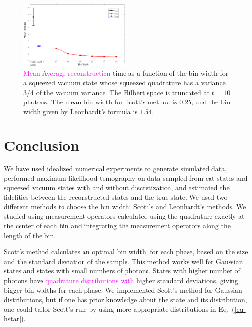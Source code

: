 \documentclass[
reprint,
superscriptaddress,
showpacs,
amsmath,
amssymb,
aps,
pra,
longbibliography
]{revtex4-1}
\providecommand{\aucmnt}[1]{#1}
\providecommand{\editcolor}[2]{\textcolor{#1}{#2}}
\providecommand{\aucmnt}[1]{}
\providecommand{\editcolor}[2]{#2}
\newcommand{\SG}[1]{\editcolor{magenta}{#1}}
\newcommand{\SGs}[1]{\aucmnt{\editcolor{magenta}{\sout{#1}}}}
\begin{document}
\begin{figure}
  \includegraphics[width=0.49\textwidth]{time-vacuocomprimido.eps}
  \caption{\SGs{Mean} \SG{Average reconstruction} time as a function
    of the bin width for a squeezed vacuum state whose squeezed
    quadrature has a variance 3/4 of the vacuum variance. The Hilbert
    space is truncated at $t=10$ photons. The mean bin width for
    Scott's method is $0.25$, and the bin width given by Leonhardt's
    formula is $1.54$.}
  \label{fig-time-squeezed}
\end{figure}



\section{Conclusion}
\label{conclusion}

We have used idealized numerical experiments to generate simulated
data, performed maximum likelihood tomography on data sampled
from cat states and squeezed vacuum states with and without
discretization, and estimated the fidelities between
the reconstructed states and the true state. We used two different
methods to choose the bin width: Scott's and Leonhardt's methods. We
studied using measurement operators calculated using the
quadrature exactly at the center of each bin and integrating the
measurement operators along the length of the bin. 

Scott's method calculates an optimal bin width, for each phase, based
on the size and the standard deviation of the sample. This method
works well for Gaussian states and states with small numbers of
photons.  States with higher number of photons have \SG{quadrature
  distributions with} higher standard deviations, giving bigger bin
widths for each phase. We implemented Scott's method for Gaussian
distributions, but if one has prior knowledge about the state and its
distribution, one could tailor Scott's rule by using more appropriate
distributions in Eq.~(\ref{eq-hstar}).
\end{document}
